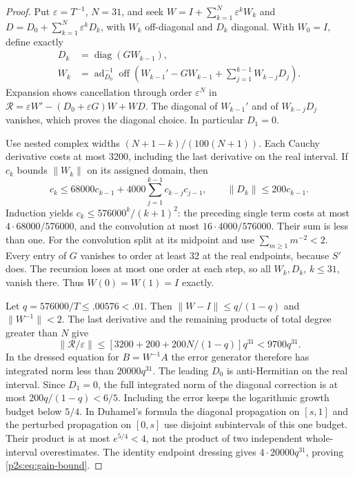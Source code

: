 \documentclass[11pt]{article}
\numberwithin{equation}{section}
\theoremstyle{definition}
\theoremstyle{remark}
\begin{document}
\begin{proof}
Put $\varepsilon=T^{-1}$, $N=31$, and seek
$W=I+\sum_{k=1}^N\varepsilon^kW_k$ and
$D=D_0+\sum_{k=1}^N\varepsilon^kD_k$, with $W_k$ off-diagonal and $D_k$
diagonal. With $W_0=I$, define exactly
\begin{align}\label{p2s:eq:recursion}
 D_k&=\operatorname{diag}(GW_{k-1}),\\
 W_k&=\operatorname{ad}_{D_0}^{-1}\operatorname{off}
 \left(W_{k-1}'-GW_{k-1}+\sum_{j=1}^{k-1}W_{k-j}D_j\right).\nonumber
\end{align}
Expansion shows cancellation through order $\varepsilon^N$ in
$\mathcal R=\varepsilon W'-(D_0+\varepsilon G)W+WD$.
The diagonal of $W_{k-1}'$ and of $W_{k-j}D_j$ vanishes, which proves
the diagonal choice. In particular $D_1=0$.

Use nested complex widths $(N+1-k)/(100(N+1))$. Each Cauchy derivative
costs at most 3200, including the last derivative on the real interval.
If $c_k$ bounds $\|W_k\|$ on its assigned domain, then
\[
 c_k\leq68000c_{k-1}
       +4000\sum_{j=1}^{k-1}c_{k-j}c_{j-1},
 \qquad \|D_k\|\leq200c_{k-1}.
\]
Induction yields $c_k\leq576000^k/(k+1)^2$: the preceding single term
costs at most $4\cdot68000/576000$, and the convolution at most
$16\cdot4000/576000$. Their sum is less than one.
For the convolution split at its midpoint and use
$\sum_{m\geq1}m^{-2}<2$. Every entry of $G$ vanishes to order at least 32
at the real endpoints, because $S'$ does. The recursion loses at most one
order at each step, so all $W_k,D_k$, $k\leq31$, vanish there.
Thus $W(0)=W(1)=I$ exactly.

Let $q=576000/T\leq.00576<.01$. Then $\|W-I\|\leq q/(1-q)$ and
$\|W^{-1}\|<2$. The last derivative and the remaining products of total
degree greater than $N$ give
\[
 \|\mathcal R/\varepsilon\|
 \leq[3200+200+200N/(1-q)]q^{31}<9700q^{31}.
\]
In the dressed equation for $B=W^{-1}A$ the error generator therefore has
integrated norm less than $20000q^{31}$. The leading $D_0$ is anti-Hermitian
on the real interval. Since $D_1=0$, the full integrated norm of the
diagonal correction is at most $200q/(1-q)<6/5$.
Including the error keeps the logarithmic growth budget below $5/4$.
In Duhamel's formula the diagonal propagation on $[s,1]$ and the perturbed
propagation on $[0,s]$ use disjoint subintervals of this one budget.
Their product is at most $e^{5/4}<4$, not the product of two independent
whole-interval overestimates. The identity endpoint dressing gives
$4\cdot20000q^{31}$, proving \eqref{p2s:eq:gain-bound}.


\end{proof}
\end{document}
